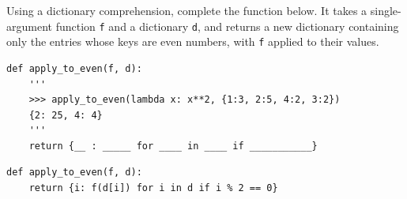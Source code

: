 \begin{blocksection}
\question Using a dictionary comprehension, complete the function below. It takes a single-argument function \lstinline{f} and a dictionary \lstinline{d}, and returns a new dictionary containing only the entries whose keys are even numbers, with \lstinline{f} applied to their values.

    
    
\begin{lstlisting}
def apply_to_even(f, d):
    '''
    >>> apply_to_even(lambda x: x**2, {1:3, 2:5, 4:2, 3:2})
    {2: 25, 4: 4}
    '''
    return {__ : _____ for ____ in ____ if ___________}
\end{lstlisting}

\begin{solution}
\begin{lstlisting}
def apply_to_even(f, d):
    return {i: f(d[i]) for i in d if i % 2 == 0}
\end{lstlisting}
\end{solution}
\end{blocksection}

